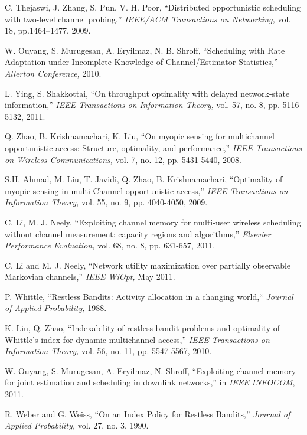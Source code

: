 \documentclass[11pt,twocolumn]{IEEEtran}
\begin{document}
\begin{thebibliography}{1}
C. Thejaswi, J. Zhang, S. Pun, V. H. Poor, ``Distributed
opportunistic scheduling with two-level channel probing,'' \emph{IEEE/ACM Transactions on Networking,} vol. 18, pp.1464--1477, 2009.

W. Ouyang, S. Murugesan, A. Eryilmaz, N. B. Shroff, ``Scheduling with Rate Adaptation under Incomplete Knowledge of Channel/Estimator Statistics,'' \emph{Allerton Conference,} 2010.

L. Ying, S. Shakkottai, ``On throughput optimality with delayed network-state information,'' \emph{IEEE Transactions on Information Theory,} vol. 57, no. 8, pp. 5116-5132, 2011.

Q. Zhao, B. Krishnamachari, K. Liu, ``On myopic sensing for multichannel opportunistic access: Structure, optimality, and performance,''
\emph{IEEE Transactions on Wireless Communications,} vol. 7, no. 12, pp. 5431-5440, 2008.

S.H. Ahmad, M. Liu, T. Javidi, Q. Zhao, B. Krishnamachari,
``Optimality of myopic sensing in multi-Channel opportunistic access,'' \emph{IEEE Transactions on Information Theory,} vol. 55, no. 9, pp. 4040-4050, 2009.

C. Li, M. J. Neely, ``Exploiting channel memory for multi-user wireless scheduling without channel measurement: capacity regions and algorithms,'' \emph{Elsevier Performance Evaluation,} vol. 68, no. 8, pp. 631-657, 2011.

C. Li and M. J. Neely, ``Network utility maximization over partially observable Markovian channels,'' \emph{IEEE WiOpt,} May 2011.

P. Whittle, ``Restless Bandits: Activity allocation in a
changing world,`` \emph{Journal of Applied Probability,} 1988.

K. Liu, Q. Zhao, ``Indexability of restless bandit problems
and optimality of Whittle's index for dynamic multichannel access,''
\emph{IEEE Transactions on Information Theory,} vol. 56, no. 11, pp. 5547-5567, 2010.

W. Ouyang, S. Murugesan, A. Eryilmaz, N. Shroff, ``Exploiting channel memory for joint estimation and scheduling in downlink networks,'' in \emph{IEEE INFOCOM},  2011.

R. Weber and G. Weiss, ``On an Index Policy for Restless Bandits,''
 \emph{Journal of Applied Probability,} vol. 27, no. 3, 1990.


\end{thebibliography}
\end{document}
